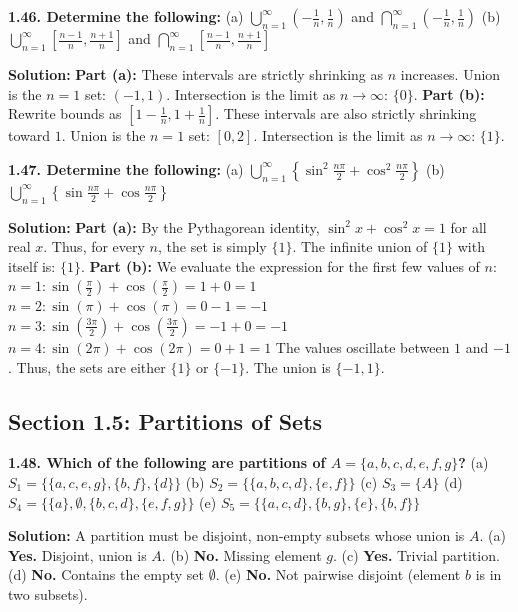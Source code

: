 \documentclass[12pt]{article}
\begin{document}
\hrulefill

\textbf{1.46. Determine the following:}
(a) $\bigcup_{n=1}^\infty \left(-\frac{1}{n}, \frac{1}{n}\right)$ and $\bigcap_{n=1}^\infty \left(-\frac{1}{n}, \frac{1}{n}\right)$
(b) $\bigcup_{n=1}^\infty \left[\frac{n-1}{n}, \frac{n+1}{n}\right]$ and $\bigcap_{n=1}^\infty \left[\frac{n-1}{n}, \frac{n+1}{n}\right]$

\textbf{Solution:}
\textbf{Part (a):} These intervals are strictly shrinking as $n$ increases.
Union is the $n=1$ set: $(-1, 1)$.
Intersection is the limit as $n \to \infty$: $\{0\}$.
\textbf{Part (b):} Rewrite bounds as $\left[1 - \frac{1}{n}, 1 + \frac{1}{n}\right]$.
These intervals are also strictly shrinking toward $1$.
Union is the $n=1$ set: $[0, 2]$.
Intersection is the limit as $n \to \infty$: $\{1\}$.

\hrulefill

\textbf{1.47. Determine the following:}
(a) $\bigcup_{n=1}^\infty \left\{ \sin^2 \frac{n\pi}{2} + \cos^2 \frac{n\pi}{2} \right\}$
(b) $\bigcup_{n=1}^\infty \left\{ \sin \frac{n\pi}{2} + \cos \frac{n\pi}{2} \right\}$

\textbf{Solution:}
\textbf{Part (a):} By the Pythagorean identity, $\sin^2 x + \cos^2 x = 1$ for all real $x$. Thus, for every $n$, the set is simply $\{1\}$.
The infinite union of $\{1\}$ with itself is: $\{1\}$.
\textbf{Part (b):} We evaluate the expression for the first few values of $n$:
$n=1: \sin(\frac{\pi}{2}) + \cos(\frac{\pi}{2}) = 1 + 0 = 1$
$n=2: \sin(\pi) + \cos(\pi) = 0 - 1 = -1$
$n=3: \sin(\frac{3\pi}{2}) + \cos(\frac{3\pi}{2}) = -1 + 0 = -1$
$n=4: \sin(2\pi) + \cos(2\pi) = 0 + 1 = 1$
The values oscillate between $1$ and $-1$. Thus, the sets are either $\{1\}$ or $\{-1\}$.
The union is $\{-1, 1\}$.

\subsection{Section 1.5: Partitions of Sets}

\textbf{1.48. Which of the following are partitions of $A = \{a, b, c, d, e, f, g\}$?}
(a) $S_1 = \{\{a, c, e, g\}, \{b, f\}, \{d\}\}$ \quad (b) $S_2 = \{\{a, b, c, d\}, \{e, f\}\}$
(c) $S_3 = \{A\}$ \quad (d) $S_4 = \{\{a\}, \emptyset, \{b, c, d\}, \{e, f, g\}\}$ \quad (e) $S_5 = \{\{a, c, d\}, \{b, g\}, \{e\}, \{b, f\}\}$

\textbf{Solution:}
A partition must be disjoint, non-empty subsets whose union is $A$.
(a) \textbf{Yes.} Disjoint, union is $A$.
(b) \textbf{No.} Missing element $g$.
(c) \textbf{Yes.} Trivial partition.
(d) \textbf{No.} Contains the empty set $\emptyset$.
(e) \textbf{No.} Not pairwise disjoint (element $b$ is in two subsets).
\end{document}
